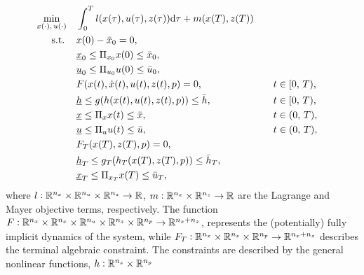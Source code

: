 \documentclass{article}
\begin{document}
\begin{equation}
\begin{aligned}
&\underset{\begin{subarray}{c}
    x(\cdot),\,u(\cdot)
\end{subarray}}{\min}	    &&\int_0^T l(x(\tau), u(\tau), z(\tau))\mathrm{d}\tau + m(x(T), z(T))\\ 
                            &\,\,\,\quad \text{s.t.}    &&x(0) - \bar{x}_0 = 0, &&\\
                            & 						    &&\underline{x}_0 \leq \Pi_{x_0}x(0) \leq \bar{x}_0, &&\\
                            & 						    &&\underline{u}_0 \leq \Pi_{u_0}u(0) \leq \bar{u}_0, &&\\
                            & 						    &&F(x(t), \dot{x}(t), u(t), z(t), p) = 0, &&\quad t \in [0,\,T),\\
                            & 						    &&\underline{h} \leq g(h(x(t), u(t), z(t), p)) \leq \bar{h}, &&\quad t \in [0,\,T),\\
                            & 						    &&\underline{x} \leq \Pi_{x}x(t) \leq \bar{x}, &&\quad t \in (0,\,T),\\
                            & 						    &&\underline{u} \leq \Pi_{u}u(t) \leq \bar{u}, &&\quad t \in (0,\,T),\\
                            & 						    &&F_T(x(T), z(T), p) = 0, &&\\
                            & 						    &&\underline{h}_T \leq g_T(h_T(x(T), z(T), p)) \leq \bar{h}_T, &&\\
                            & 						    &&\underline{x}_T \leq \Pi_{x_T}x(T) \leq \bar{u}_{T}, &&\\
\end{aligned}
\end{equation}
where $l\vcentcolon \mathbb{R}^{n_x}\times\mathbb{R}^{n_u}\times\mathbb{R}^{n_z} \rightarrow \mathbb{R}$, $m\vcentcolon \mathbb{R}^{n_x}\times\mathbb{R}^{n_z} \rightarrow \mathbb{R}$ are the Lagrange and Mayer objective terms, respectively. The function $F\vcentcolon \mathbb{R}^{n_x}\times\mathbb{R}^{n_x}\times\mathbb{R}^{n_u}\times\mathbb{R}^{n_z}\times\mathbb{R}^{n_p} \rightarrow \mathbb{R}^{n_x+n_z}$, represents the (potentially) fully implicit dynamics
of the system, while $F_T\vcentcolon \mathbb{R}^{n_x}\times\mathbb{R}^{n_z}\times\mathbb{R}^{n_p} \rightarrow \mathbb{R}^{n_x+n_z}$ describes the terminal algebraic constraint. The constraints are described by the general nonlinear functions, $h\vcentcolon \mathbb{R}^{n_z}\times\mathbb{R}^{n_p}$
\end{document}
